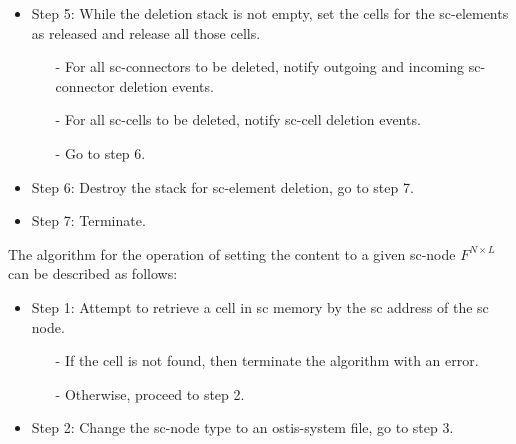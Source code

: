 \documentclass{article}
\begin{document}
\begin{multicols}{2}
\begin{itemize}
\itemsep = 0mm
\item Step 5: While the deletion stack is not empty, set
the cells for the sc-elements as released and release all those cells.



\begin{itemize}
\itemsep=0mm
\item[-] For all sc-connectors to be deleted, notify outgoing and incoming sc-connector deletion events.

\item[-]For all sc-cells to be deleted, notify sc-cell deletion events.
\item[-]  Go to step 6.

\end{itemize}

\end{itemize}
\begin{itemize}
\itemsep = 0mm
\item Step 6: Destroy the stack for sc-element deletion, go
to step 7.


\end{itemize}

\begin{itemize}
\itemsep = 0mm
\item  Step 7: Terminate.


\end{itemize}
The algorithm for the operation of setting the content
to a given sc-node \textit{$F^{N\times{L}}$} can be described as follows:


\begin{itemize}
\itemsep = 0mm
\item Step 1: Attempt to retrieve a cell in sc memory by
the sc address of the sc node.



\begin{itemize}
\itemsep=0mm
\item[-] If the cell is not found, then terminate the algorithm with an error.

\item[-]Otherwise, proceed to step 2.


\end{itemize}

\end{itemize}

\begin{itemize}
\itemsep = 0mm
\item  Step 2: Change the sc-node type to an ostis-system
file, go to step 3.



\end{itemize}
\end{multicols}
\end{document}
